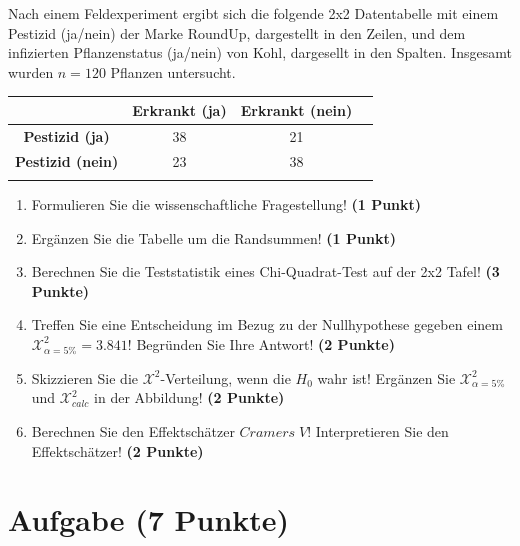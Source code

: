 \documentclass[a4paper, 10pt]{scrartcl}\usepackage[]{graphicx}\usepackage[]{xcolor}
\begin{document}
Nach einem Feldexperiment ergibt sich die folgende 2x2 Datentabelle mit einem
Pestizid (ja/nein) der Marke RoundUp, dargestellt in den Zeilen, und
dem infizierten Pflanzenstatus (ja/nein) von Kohl, dargesellt in
den Spalten. Insgesamt wurden $n = 120$ Pflanzen untersucht.
\vspace{5Ex}

\begin{center}
  \Large
  \begin{tabular}{c|c|c|c}
     & \textbf{Erkrankt (ja)} & \textbf{Erkrankt (nein)} &  \strut\\
    \hline
    \textbf{Pestizid (ja)} & 38  & 21  &     \strut\\
    \hline
    \textbf{Pestizid (nein)} & 23  & 38  &      \strut\\
    \hline
     \phantom{100} & \phantom{100}  & \phantom{100}  &  \phantom{100}  \strut\\
  \end{tabular}
\end{center}

\vspace{5Ex}

\begin{enumerate}
\item Formulieren Sie die wissenschaftliche Fragestellung! \textbf{(1 Punkt)}
\item Erg{\"a}nzen Sie die Tabelle um die Randsummen! \textbf{(1 Punkt)} 
\item Berechnen Sie die Teststatistik eines Chi-Quadrat-Test auf der 2x2
  Tafel! \textbf{(3 Punkte)}
\item Treffen Sie eine Entscheidung im Bezug zu der Nullhypothese gegeben
  einem $\mathcal{X}^2_{\alpha = 5\%} = 3.841$! Begr{\"u}nden Sie Ihre Antwort!
  \textbf{(2 Punkte)}
\item Skizzieren Sie die $\mathcal{X}^2$-Verteilung, wenn die $H_0$ wahr
  ist! Erg{\"a}nzen Sie  $\mathcal{X}^2_{\alpha = 5\%}$ und
  $\mathcal{X}^2_{calc}$ in der Abbildung! \textbf{(2 Punkte)}
\item Berechnen Sie den Effektsch{\"a}tzer $Cramers\; V$! Interpretieren Sie den
  Effektsch{\"a}tzer! \textbf{(2 Punkte)}
\end{enumerate} 
\clearpage

\section{Aufgabe \hfill (7 Punkte)}
\end{document}
